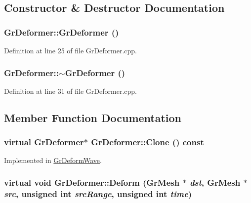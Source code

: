 \subsection{Constructor \& Destructor Documentation}
\hypertarget{class_gr_deformer_a5b17243ba7878e1b90cb83af9f65454}{
\subsubsection[{GrDeformer}]{\setlength{\rightskip}{0pt plus 5cm}GrDeformer::GrDeformer ()}}
\label{class_gr_deformer_a5b17243ba7878e1b90cb83af9f65454}




Definition at line 25 of file GrDeformer.cpp.\hypertarget{class_gr_deformer_b423190f6b4230b156575d5c9894c465}{
\subsubsection[{$\sim$GrDeformer}]{\setlength{\rightskip}{0pt plus 5cm}GrDeformer::$\sim$GrDeformer ()}}
\label{class_gr_deformer_b423190f6b4230b156575d5c9894c465}




Definition at line 31 of file GrDeformer.cpp.

\subsection{Member Function Documentation}
\hypertarget{class_gr_deformer_3a9f2e2afaea68d88f822b8e7daf3c8d}{
\subsubsection[{Clone}]{\setlength{\rightskip}{0pt plus 5cm}virtual {\bf GrDeformer}$\ast$ GrDeformer::Clone () const}}
\label{class_gr_deformer_3a9f2e2afaea68d88f822b8e7daf3c8d}




Implemented in \hyperlink{class_gr_deform_wave_10a98b00fc599df89a98ba33544c9569}{GrDeformWave}.\hypertarget{class_gr_deformer_488a6a9156e48777a0042920cb8dd15e}{
\subsubsection[{Deform}]{\setlength{\rightskip}{0pt plus 5cm}virtual void GrDeformer::Deform ({\bf GrMesh} $\ast$ {\em dst}, \/  {\bf GrMesh} $\ast$ {\em src}, \/  unsigned int {\em srcRange}, \/  unsigned int {\em time})}}
\label{class_gr_deformer_488a6a9156e48777a0042920cb8dd15e}




